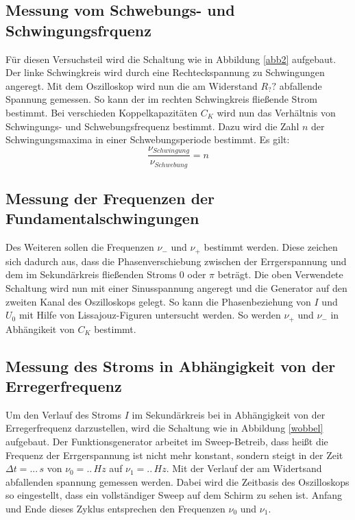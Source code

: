 \documentclass[11pt,ngerman,a4paper]{article}
\begin{document}
\subsection{Messung vom Schwebungs- und Schwingungsfrquenz}
Für diesen Versuchsteil wird die Schaltung wie in Abbildung \ref{abb2} aufgebaut. Der linke Schwingkreis wird durch eine Rechteckspannung zu Schwingungen angeregt. Mit dem Oszilloskop wird nun die am Widerstand $R_??$ abfallende Spannung gemessen. So kann der im rechten Schwingkreis fließende Strom bestimmt. Bei verschieden Koppelkapazitäten $C_K$ wird nun das Verhältnis von Schwingungs- und Schwebungsfrequenz bestimmt. Dazu wird die Zahl $n$ der Schwingungsmaxima in einer Schwebungsperiode bestimmt. Es gilt:
\begin{equation}
\frac{\nu_{Schwingung}}{\nu_{Schwebung}} = n
\end{equation}
\subsection{Messung der Frequenzen der Fundamentalschwingungen}
Des Weiteren sollen die Frequenzen $\nu_-$ und $\nu_+$ bestimmt werden. Diese zeichen sich dadurch aus, dass die Phasenverschiebung zwischen der Errgerspannung und dem im Sekundärkreis fließenden Stroms $0$ oder $\pi$ beträgt. Die oben Verwendete Schaltung wird nun mit einer Sinusspannung angeregt und die Generator auf den zweiten Kanal des Oszilloskops gelegt. So kann die Phasenbeziehung von $I$ und $U_0$ mit Hilfe von Lissajouz-Figuren untersucht werden. So werden $\nu_+$ und $\nu_-$ in Abhängikeit von $C_K$ bestimmt.
\subsection{Messung des Stroms in Abhängigkeit von der Erregerfrequenz}
Um den Verlauf des Stroms $I$ im Sekundärkreis bei in Abhängigkeit von der Erregerfrequenz darzustellen, wird die Schaltung wie in Abbildung \ref{wobbel} aufgebaut. Der Funktionsgenerator arbeitet im Sweep-Betreib, dass heißt die Frequenz der Errgerspannung ist nicht mehr konstant, sondern steigt in der Zeit$\Delta t = ...\,s$ von $\nu_0 = ..\,Hz$ auf $\nu_1 = ..\,Hz$. Mit der Verlauf der am Widertsand abfallenden spannung gemessen werden. Dabei wird die Zeitbasis des Oszilloskops so eingestellt, dass ein vollständiger Sweep auf dem Schirm zu sehen ist. Anfang und Ende dieses Zyklus entsprechen den Frequenzen $\nu_0$ und $\nu_1$.     
\end{document}
